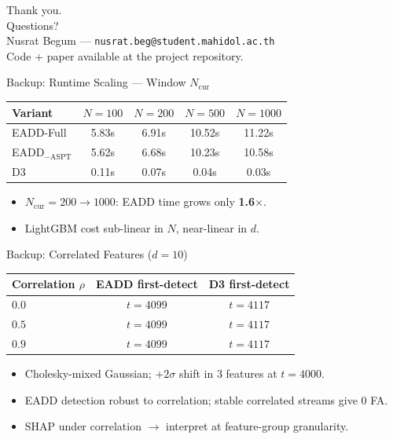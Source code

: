 \documentclass[aspectratio=169,10pt]{beamer}
\begin{document}
\begin{frame}[plain]
\vspace*{\fill}
\centering
{\Huge Thank you.}\\[1em]
{\Large Questions?}\\[2em]
{\small
Nusrat Begum --- \texttt{nusrat.beg@student.mahidol.ac.th}\\[0.4em]
Code + paper available at the project repository.
}
\vspace*{\fill}
\end{frame}

\appendix
\begin{frame}{Backup: Runtime Scaling — Window $N_{\mathrm{cur}}$}
\centering\small
\begin{tabular}{lcccc}
\toprule
\textbf{Variant} & \textbf{$N{=}100$} & \textbf{$N{=}200$} & \textbf{$N{=}500$} & \textbf{$N{=}1000$} \\
\midrule
EADD-Full            & 5.83s & 6.91s & 10.52s & 11.22s \\
EADD$_{-\mathrm{ASPT}}$ & 5.62s & 6.68s & 10.23s & 10.58s \\
D3                   & 0.11s & 0.07s & 0.04s  & 0.03s  \\
\bottomrule
\end{tabular}

\bigskip
\begin{itemize}
\item $N_{\mathrm{cur}}{=}200{\to}1000$: EADD time grows only \textbf{1.6$\times$}.
\item LightGBM cost sub-linear in $N$, near-linear in $d$.
\end{itemize}
\end{frame}

\begin{frame}{Backup: Correlated Features ($d{=}10$)}
\centering\small
\begin{tabular}{lcc}
\toprule
\textbf{Correlation $\rho$} & \textbf{EADD first-detect} & \textbf{D3 first-detect} \\
\midrule
$0.0$ & $t{=}4099$ & $t{=}4117$ \\
$0.5$ & $t{=}4099$ & $t{=}4117$ \\
$0.9$ & $t{=}4099$ & $t{=}4117$ \\
\bottomrule
\end{tabular}

\bigskip
\begin{itemize}
\item Cholesky-mixed Gaussian; $+2\sigma$ shift in 3 features at $t{=}4000$.
\item EADD detection robust to correlation; stable correlated streams give 0 FA.
\item SHAP under correlation $\to$ interpret at feature-group granularity.
\end{itemize}
\end{frame}
\end{document}
